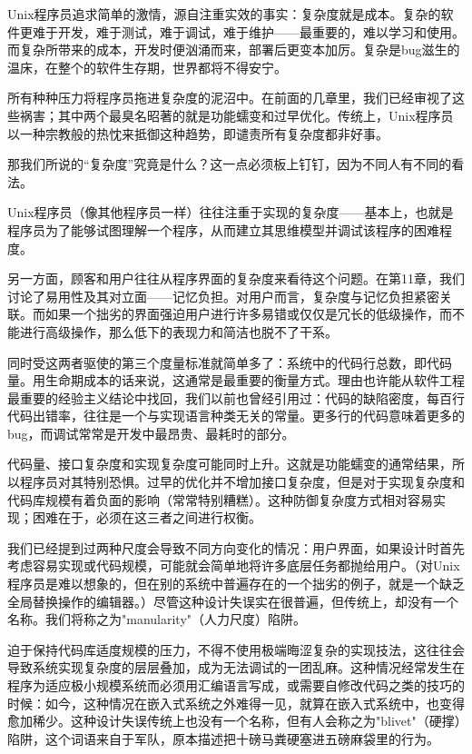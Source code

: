 \documentclass[12pt,oneside]{book}
\begin{document}
\begin{common-format}
Unix程序员追求简单的激情，源自注重实效的事实：复杂度就是成本。复杂的软件更难于开发，难于测试，难于调试，难于维护——最重要的，难以学习和使用。而复杂所带来的成本，开发时便汹涌而来，部署后更变本加厉。复杂是bug滋生的温床，在整个的软件生存期，世界都将不得安宁。

所有种种压力将程序员拖进复杂度的泥沼中。在前面的几章里，我们已经审视了这些祸害；其中两个最臭名昭著的就是功能蠕变和过早优化。传统上，Unix程序员以一种宗教般的热忱来抵御这种趋势，即谴责所有复杂度都非好事。

那我们所说的“复杂度”究竟是什么？这一点必须板上钉钉，因为不同人有不同的看法。

Unix程序员（像其他程序员一样）往往注重于实现的复杂度——基本上，也就是程序员为了能够试图理解一个程序，从而建立其思维模型并调试该程序的困难程度。

另一方面，顾客和用户往往从程序界面的复杂度来看待这个问题。在第11章，我们讨论了易用性及其对立面——记忆负担。对用户而言，复杂度与记忆负担紧密关联。而如果一个拙劣的界面强迫用户进行许多易错或仅仅是冗长的低级操作，而不能进行高级操作，那么低下的表现力和简洁也脱不了干系。

同时受这两者驱使的第三个度量标准就简单多了：系统中的代码行总数，即代码量。用生命期成本的话来说，这通常是最重要的衡量方式。理由也许能从软件工程最重要的经验主义结论中找回，我们以前也曾经引用过：代码的缺陷密度，每百行代码出错率，往往是一个与实现语言种类无关的常量。更多行的代码意味着更多的bug，而调试常常是开发中最昂贵、最耗时的部分。

代码量、接口复杂度和实现复杂度可能同时上升。这就是功能蠕变的通常结果，所以程序员对其特别恐惧。过早的优化并不增加接口复杂度，但是对于实现复杂度和代码库规模有着负面的影响（常常特别糟糕）。这种防御复杂度方式相对容易实现；困难在于，必须在这三者之间进行权衡。

我们已经提到过两种尺度会导致不同方向变化的情况：用户界面，如果设计时首先考虑容易实现或代码规模，可能就会简单地将许多底层任务都抛给用户。（对Unix程序员是难以想象的，但在别的系统中普遍存在的一个拙劣的例子，就是一个缺乏全局替换操作的编辑器。）尽管这种设计失误实在很普遍，但传统上，却没有一个名称。我们将称之为"manularity"（人力尺度）陷阱。

迫于保持代码库适度规模的压力，不得不使用极端晦涩复杂的实现技法，这往往会导致系统实现复杂度的层层叠加，成为无法调试的一团乱麻。这种情况经常发生在程序为适应极小规模系统而必须用汇编语言写成，或需要自修改代码之类的技巧的时候：如今，这种情况在嵌入式系统之外难得一见，就算在嵌入式系统中，也变得愈加稀少。这种设计失误传统上也没有一个名称，但有人会称之为"blivet"（硬撑）陷阱，这个词语来自于军队，原本描述把十磅马粪硬塞进五磅麻袋里的行为。


\end{common-format}
\end{document}
